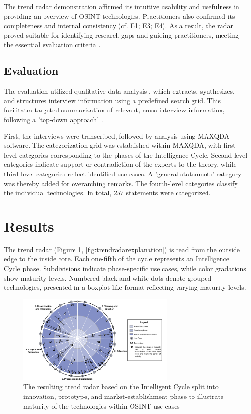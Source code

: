\documentclass[10pt]{article}
\begin{document}
The trend radar demonstration affirmed its intuitive usability and usefulness in providing an overview of OSINT technologies. Practitioners also confirmed its completeness and internal consistency (cf. E1; E3; E4). As a result, the radar proved suitable for identifying research gaps and guiding practitioners, meeting the essential evaluation criteria \cite{Sonnenberg.2012}.

\subsection{Evaluation} \label{sec:eval}

The evaluation utilized qualitative data analysis \cite{Glaser.2009}, which extracts, synthesizes, and structures interview information using a predefined search grid. This facilitates targeted summarization of relevant, cross-interview information, following a 'top-down approach' \cite{Bogner.2014, Glaser.2009}.

First, the interviews were transcribed, followed by analysis using MAXQDA software. The categorization grid was established within MAXQDA, with first-level categories corresponding to the phases of the Intelligence Cycle. Second-level categories indicate support or contradiction of the experts to the theory, while third-level categories reflect identified use cases. A 'general statements' category was thereby added for overarching remarks. The fourth-level categories classify the individual technologies. In total, 257 statements were categorized.

\section{Results} \label{sec:results}

The trend radar (Figure \ref{fig:trendradar}, \ref{fig:trendradarexplanation}) is read from the outside edge to the inside core.
Each one-fifth of the cycle represents an Intelligence Cycle phase. Subdivisions indicate
phase-specific use cases, while color gradations show maturity levels. Numbered black
and white dots denote grouped technologies, presented in a boxplot-like format reflecting
varying maturity levels.

\begin{figure}[thb]
    \centering
    \includegraphics[width=0.7\textwidth]{PDF/images/crop_Trendradar}
    \caption{The resulting trend radar based on the Intelligent Cycle split into innovation, prototype, and market-establishment phase to illustrate maturity of the technologies within OSINT use cases}
    \label{fig:trendradar}
\end{figure}
\end{document}
